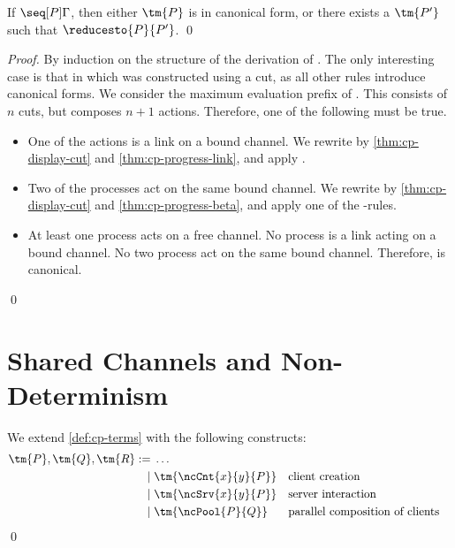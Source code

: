\documentclass[UKenglish]{llncs}
\begin{document}
\begin{theorem}[Progress]\label{thm:cp-progress}
  If $\seq[{ P }]{ \Gamma }$, then either $\tm{P}$ is in canonical form, or
  there exists a $\tm{P'}$ such that $\reducesto{P}{P'}$. 
  \qed
\end{theorem}
\begin{proof}
  By induction on the structure of the derivation of \seq[P]{\Gamma}.
  The only interesting case is that in which  was constructed using a cut,
  as all other rules introduce canonical forms.
  We consider the maximum evaluation prefix  of . This consists of
  $n$ cuts, but composes $n+1$ actions. Therefore, one of the following must be
  true.
  \begin{itemize}
  \item
    One of the actions is a link on a bound channel.
    We rewrite by \cref{thm:cp-display-cut} and \cref{thm:cp-progress-link},
    and apply .
  \item
    Two of the processes act on the same bound channel.
    We rewrite by \cref{thm:cp-display-cut} and \cref{thm:cp-progress-beta},
    and apply one of the \textbeta-rules.
  \item
    At least one process acts on a free channel. No process is a link acting on
    a bound channel. No two process act on the same bound channel. Therefore,
     is canonical.
  \end{itemize}
  \qed
\end{proof}

\section{Shared Channels and Non-Determinism}\label{sec:cpnd}

\begin{definition}[Terms]\label{def:nc-terms}
  We extend \cref{def:cp-terms} with the following constructs:
  \[\!
    \begin{aligned}
      \tm{P}, \tm{Q}, \tm{R}
           :=& \; \dots
      \\ \mid& \; \tm{\ncCnt{x}{y}{P}} &&\text{client creation}
      \\ \mid& \; \tm{\ncSrv{x}{y}{P}} &&\text{server interaction}
      \\ \mid& \; \tm{\ncPool{P}{Q}}   &&\text{parallel composition of clients}
    \end{aligned}
  \]
  \qed
\end{definition}
\end{document}
